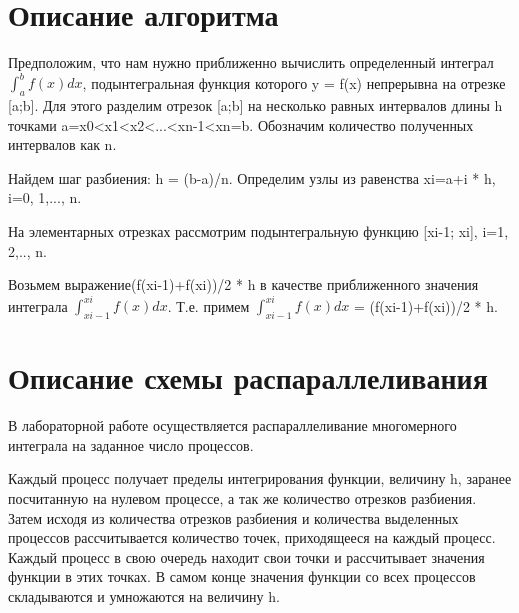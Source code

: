 \documentclass{report}
\begin{document}
	\newpage
	
	\section*{Описание алгоритма}
	Предположим, что нам нужно приближенно вычислить определенный интеграл $\int_a^b f(x)dx$, подынтегральная функция которого y = f(x) непрерывна на отрезке [a;b]. Для этого разделим отрезок [a;b] на несколько равных интервалов длины h точками  a=x0<x1<x2<...<xn-1<xn=b. Обозначим количество полученных интервалов как n.
	\par Найдем шаг разбиения: h = (b-a)/n. Определим узлы из равенства xi=a+i * h, i=0, 1,..., n.
	\par На элементарных отрезках рассмотрим подынтегральную функцию [xi-1; xi], i=1, 2,.., n.
	\par Возьмем выражение(f(xi-1)+f(xi))/2 * h в качестве приближенного значения интеграла $\int_{xi-1}^{xi} f(x)dx$. Т.е. примем $\int_{xi-1}^{xi} f(x)dx$ = (f(xi-1)+f(xi))/2 * h.
	\newpage
	
	\section*{Описание схемы распараллеливания}
	В лабораторной работе осуществляется распараллеливание многомерного интеграла на заданное число процессов. 
	\par Каждый процесс получает пределы интегрирования функции, величину h, заранее посчитанную на нулевом процессе, а так же количество отрезков разбиения. Затем исходя из количества отрезков разбиения и количества выделенных процессов рассчитывается количество точек, приходящееся на каждый процесс. Каждый процесс в свою очередь находит свои точки и рассчитывает значения функции в этих точках. В самом конце значения функции со всех процессов складываются и умножаются на величину h. 
	\newpage
	
\end{document}
